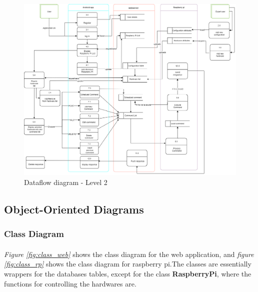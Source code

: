 \documentclass[12pt, oneside, a4paper]{book}
\begin{document}
				\begin{figure}[H]
					\includegraphics[width=\linewidth]{img/diagram_dataflow_lvl2.png}
					\caption{Dataflow diagram - Level 2}
				\end{figure}
				\newpage\subsection{Object-Oriented Diagrams}
				\subsubsection{Class Diagram}
					\paragraph{} \textit{Figure \ref{fig:class_web}} shows the class diagram for the web application, and \textit{figure \ref{fig:class_rp}} shows the class diagram for raspberry pi.The classes are essentially wrappers for the databases tables, except for the class \textbf{RaspberryPi}, where the functions for controlling the hardwares are.
\end{document}

